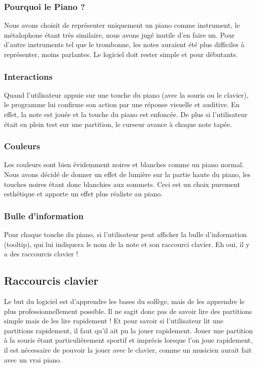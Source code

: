 \documentclass{article}
\begin{document}
\subsubsection{Pourquoi le Piano ?}
Nous avons choisit de représenter uniquement un piano comme instrument, le métalophone étant très similaire, nous avons
jugé inutile d'en faire un. Pour d'autre instruments tel que le trombonne, les notes auraient été plus difficiles à représenter,
moins parlantes. Le logiciel doit rester simple et pour débutants.
\subsubsection{Interactions}
Quand l'utilisateur appuie sur une touche du piano (avec la souris ou le clavier),
le programme lui confirme son action par une réponse visuelle et auditive.
En effet, la note est jouée et la touche du piano est enfoncée. De plus si l'utilisateur était en plein test sur une partition,
le curseur avance à chaque note tapée.
\subsubsection{Couleurs}
Les couleurs sont bien évidemment noires et blanches comme un piano normal. Nous avons décidé de donner un effet de lumière 
sur la partie haute du piano, les touches noires étant donc blanchies aux sommets. Ceci est un choix purement esthétique et 
apporte un effet plus réaliste au piano.
\subsubsection{Bulle d'information}
Pour chaque touche du piano, si l'utilisateur peut afficher la bulle d'information (tooltip), qui lui indiquera le nom de la 
note et son raccourci clavier. Eh oui, il y a des raccourcis clavier !
\subsection{Raccourcis clavier}
Le but du logiciel est d'apprendre les bases du solfège, mais de les apprendre le plus professionnellement possible.
Il ne sagit donc pas de savoir lire des partitions simple mais de les lire rapidement !
Et pour savoir si l'utilisateur lit une partitions rapidement, il faut qu'il ait pu la jouer rapidement.
Jouer une partition à la souris étant particulièrement sportif et imprécis lorsque l'on joue rapidement, il est nécessaire
de pouvoir la jouer avec le clavier, comme un musicien aurait fait avec un vrai piano.
\end{document}

